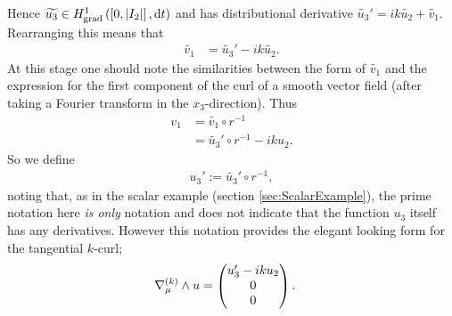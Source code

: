 Hence $\widetilde{u_3}\in H^1_\mathrm{grad}\left( \left[ 0,\lvert I_2 \rvert \right], \mathrm{d}t \right)$ and has distributional derivative $\widetilde{u_3}' = ik\widetilde{u_2} + \widetilde{v_1}$.
Rearranging this means that 
\begin{align*}
\widetilde{v_1} &= \widetilde{u_3}' - ik\widetilde{u_2}.
\end{align*}
At this stage one should note the similarities between the form of $\widetilde{v_1}$ and the expression for the first component of the curl of a smooth vector field (after taking a Fourier transform in the $x_3$-direction).
Thus 
\begin{align*}
	v_1 &= \widetilde{v_1}\circ r^{-1} \\
	&= \widetilde{u_3}'\circ r^{-1} - iku_2.
\end{align*}
So we define
\begin{align*}
	u_3' := \widetilde{u_3}'\circ r^{-1},
\end{align*}
noting that, as in the scalar example (section \ref{sec:ScalarExample}), the prime notation here \textit{is only} notation and does not indicate that the function $u_3$ itself has any derivatives.
However this notation provides the elegant looking form for the tangential $k$-curl;
\begin{align*}
	\nabla_{\mu}^{(k)}\wedge u &= \begin{pmatrix} u_3' - iku_2 \\ 0 \\ 0 \end{pmatrix}.
\end{align*}


